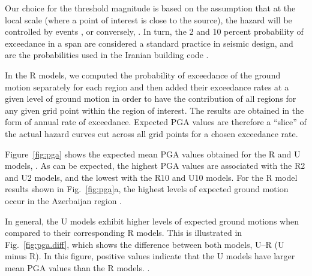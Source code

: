 Our choice for the threshold magnitude is based on the assumption that at the local scale (where a point of interest is close to the source), the hazard will be controlled by events , or conversely, . In turn, the 2 and 10 percent probability of exceedance in a  span are considered a standard practice in seismic design, and are the probabilities used in the Iranian building code \citep{BHRC2014}.

In the R models, we computed the probability of exceedance of the ground motion separately for each region and then added their exceedance rates at a given level of ground motion in order to have the contribution of all regions for any given grid point within the region of interest. The results are obtained in the form of annual rate of exceedance. Expected PGA values are therefore a ``slice'' of the actual hazard curves cut across all grid points for a chosen exceedance rate.

Figure~\ref{fig:pga} shows the expected mean PGA values obtained for the R and U models, . As can be expected, the highest PGA values are associated with the R2 and U2 models, and the lowest with the R10 and U10 models. For the R model results shown in Fig.~\ref{fig:pga}a, the highest levels of expected ground motion occur in the Azerbaijan region .

In general, the U models exhibit higher levels of expected ground motions when compared to their corresponding R models. This is illustrated in Fig.~\ref{fig:pga.diff}, which shows the difference between both models, U--R (U minus R). In this figure, positive values indicate that the U models have larger mean PGA values than the R models. .

